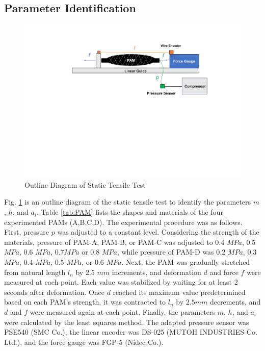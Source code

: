 \subsection{Parameter Identification}
\begin{figure}[h]
    \centering
    \includegraphics[width=\columnwidth]{fig/static_experiment.pdf}
    \caption{Outline Diagram of Static Tensile Test}
    \label{fig:static_equipment}
 \end{figure}
Fig. \ref{fig:static_equipment} is an outline diagram of the static tensile test to identify the parameters $m$, $h$, and $a_i$.
Table \ref{tab:PAM} lists the shapes and materials of the four experimented PAMs (A,B,C,D).
The experimental procedure was as follows.
First, pressure $p$ was adjusted to a constant level.
Considering the strength of the materials, pressure of PAM-A, PAM-B, or PAM-C was adjusted to 0.4 $\si{MPa}$, 0.5 $\si{MPa}$, 0.6 $\si{MPa}$, 0.7$\si{MPa}$ or 0.8 $\si{MPa}$, while pressure of PAM-D was 0.2 $\si{MPa}$, 0.3 $\si{MPa}$, 0.4 $\si{MPa}$, 0.5 $\si{MPa}$, or 0.6 $\si{MPa}$.
Next, the PAM was gradually stretched from natural length $l_n$ by 2.5 $\si{mm}$ increments, and deformation $d$ and force $f$ were measured at each point.
Each value was stabilized by waiting for at least 2 seconds after deformation.
Once $d$ reached its maximum value predetermined based on each PAM's strength, it was contracted to $l_n$ by $2.5\si{mm}$ decrements, and $d$ and $f$ were measured again at each point.
Finally, the parameters $m$, $h$, and $a_i$ were calculated by the least squares method.
The adapted pressure sensor was PSE540 (SMC Co.), the linear encoder was DS-025 (MUTOH INDUSTRIES Co. Ltd.), and the force gauge was FGP-5 (Nidec Co.).

